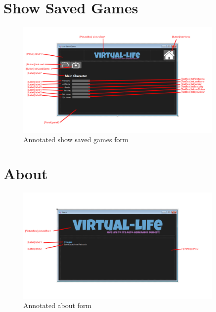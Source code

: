 \section{Show Saved Games}
\begin{figure}[H]
    \centering
    \includegraphics[width=0.9\textwidth]{images/forms/showSavedGames.png}
    \caption{Annotated show saved games form}
    \label{fig:forms-showSavedGames}
\end{figure}

\section{About}
\begin{figure}[H]
    \centering
    \includegraphics[width=0.9\textwidth]{images/forms/about.png}
    \caption{Annotated about form}
    \label{fig:forms-about}
\end{figure}

